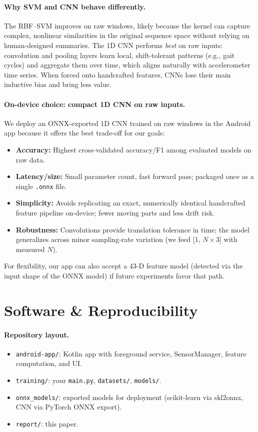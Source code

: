 \documentclass[10pt,twocolumn]{article}
\begin{document}
\paragraph{Why SVM and CNN behave differently.}
The RBF--SVM improves on raw windows, likely because the kernel can capture complex, nonlinear similarities in the original sequence space without relying on human-designed summaries. The 1D CNN performs \emph{best} on raw inputs: convolution and pooling layers learn local, shift-tolerant patterns (e.g., gait cycles) and aggregate them over time, which aligns naturally with accelerometer time series. When forced onto handcrafted features, CNNs lose their main inductive bias and bring less value.

\paragraph{On-device choice: compact 1D CNN on raw inputs.}
We deploy an ONNX-exported 1D CNN trained on raw windows in the Android app because it offers the best trade-off for our goals:
\begin{itemize}
  \item \textbf{Accuracy:} Highest cross-validated accuracy/F1 among evaluated models on raw data.
  \item \textbf{Latency/size:} Small parameter count, fast forward pass; packaged once as a single \texttt{.onnx} file.
  \item \textbf{Simplicity:} Avoids replicating an exact, numerically identical handcrafted feature pipeline on-device; fewer moving parts and less drift risk.
  \item \textbf{Robustness:} Convolutions provide translation tolerance in time; the model generalizes across minor sampling-rate variation (we feed [1, $N\!\times\!3$] with measured $N$).
\end{itemize}
For flexibility, our app can also accept a 43-D feature model (detected via the input shape of the ONNX model) if future experiments favor that path.



\section{Software \& Reproducibility}
\paragraph{Repository layout.}
\begin{itemize}
  \item \texttt{android-app/}: Kotlin app with foreground service, SensorManager, feature computation, and UI.
  \item \texttt{training/}: your \texttt{main.py}, \texttt{datasets/}, \texttt{models/}.
  \item \texttt{onnx\_models/}: exported models for deployment (scikit-learn via skl2onnx, CNN via PyTorch ONNX export).
  \item \texttt{report/}: this paper.
\end{itemize}
\end{document}
